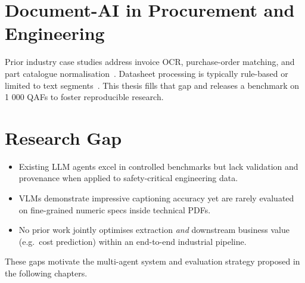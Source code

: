 \section{Document-AI in Procurement and Engineering}
Prior industry case studies address invoice OCR, purchase-order matching, and part catalogue normalisation~\cite{chung2020invoiceai, koch2022bom}.  
Datasheet processing is typically rule-based or limited to text segments~\cite{rahman2021datasheet}.
This thesis fills that gap and releases a benchmark on 1 000 QAFs to foster reproducible research.

\section{Research Gap}
\begin{itemize}
  \item Existing LLM agents excel in controlled benchmarks but lack validation and provenance when applied to safety-critical engineering data.
  \item VLMs demonstrate impressive captioning accuracy yet are rarely evaluated on fine-grained numeric specs inside technical PDFs.
  \item No prior work jointly optimises extraction \emph{and} downstream business value (e.g.\ cost prediction) within an end-to-end industrial pipeline.
\end{itemize}
These gaps motivate the multi-agent system and evaluation strategy proposed in the following chapters.
